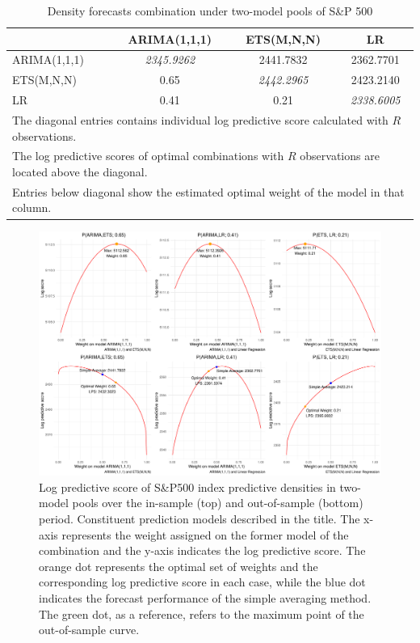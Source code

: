 \documentclass{monashthesis}
\begin{document}
\begin{table}[ht]
  \centering
  \caption{Density forecasts combination under two-model pools of S\&P 500}
    \begin{tabular}{lccc}
    \toprule
                 & ARIMA(1,1,1)       & ETS(M,N,N)         & LR \\
    \midrule
    ARIMA(1,1,1) & \textit{2345.9262} & 2441.7832          & 2362.7701 \\
    ETS(M,N,N)   & 0.65               & \textit{2442.2965} & 2423.2140 \\
    LR           & 0.41               & 0.21               & \textit{2338.6005} \\
    \bottomrule
    \multicolumn{4}{l}{\footnotesize The diagonal entries contains individual log predictive score calculated with $R$ observations.}\\
    \multicolumn{4}{l}{\footnotesize The log predictive scores of optimal combinations with $R$ observations are located above the diagonal.}\\
    \multicolumn{4}{l}{\footnotesize Entries below diagonal show the estimated optimal weight of the model in that column.}\\
    \end{tabular}
  \label{tab:2}
\end{table}

\begin{figure}[ht]
\centering
\includegraphics[scale=0.4]{figures/SP500_nonstationary.pdf}
\caption{Log predictive score of S\&P500 index predictive densities in two-model pools over the in-sample (top) and out-of-sample (bottom) period. Constituent prediction models described in the title. The x-axis represents the weight assigned on the former model of the combination and the y-axis indicates the log predictive score. The orange dot represents the optimal set of weights and the corresponding log predictive score in each case, while the blue dot indicates the forecast performance of the simple averaging method. The green dot, as a reference, refers to the maximum point of the out-of-sample curve.}
\label{fig:nonstat}
\end{figure}
\end{document}
